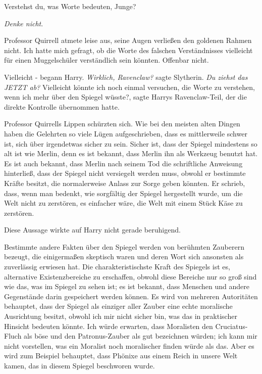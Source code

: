 \glqq{}Verstehst du, was Worte bedeuten, Junge?\grqq{}

\glqq{}\emph{Denke nicht}.\grqq{}

Professor Quirrell atmete leise aus, seine Augen verließen den goldenen Rahmen
nicht. \glqq{}Ich hatte mich gefragt, ob die Worte des falschen Verständnisses
vielleicht für einen Muggelschüler verständlich sein könnten. Offenbar
nicht.\grqq{}

\glqq{}Vielleicht -\grqq{} begann Harry. \emph{Wirklich, Ravenclaw?} sagte
Slytherin. \emph{Du ziehst das JETZT ab?} \glqq{}Vielleicht könnte ich noch
einmal versuchen, die Worte zu verstehen, wenn ich mehr über den Spiegel
wüsste?\grqq{}, sagte Harrys Ravenclaw-Teil, der die direkte Kontrolle
übernommen hatte.

Professor Quirrells Lippen schürzten sich. \glqq{}Wie bei den meisten alten
Dingen haben die Gelehrten so viele Lügen aufgeschrieben, dass es mittlerweile
schwer ist, sich über irgendetwas sicher zu sein. Sicher ist, dass der Spiegel
mindestens so alt ist wie Merlin, denn es ist bekannt, dass Merlin ihn als
Werkzeug benutzt hat. Es ist auch bekannt, dass Merlin nach seinem Tod die
schriftliche Anweisung hinterließ, dass der Spiegel nicht versiegelt werden
muss, obwohl er bestimmte Kräfte besitzt, die normalerweise Anlass zur Sorge
geben könnten. Er schrieb, dass, wenn man bedenkt, wie sorgfältig der Spiegel
hergestellt wurde, um die Welt nicht zu zerstören, es einfacher wäre, die Welt
mit einem Stück Käse zu zerstören.\grqq{}

Diese Aussage wirkte auf Harry nicht gerade beruhigend.

\glqq{}Bestimmte andere Fakten über den Spiegel werden von berühmten Zauberern
bezeugt, die einigermaßen skeptisch waren und deren Wort sich ansonsten als
zuverlässig erwiesen hat. Die charakteristischste Kraft des Spiegels ist es,
alternative Existenzbereiche zu erschaffen, obwohl diese Bereiche nur so groß
sind wie das, was im Spiegel zu sehen ist; es ist bekannt, dass Menschen und
andere Gegenstände darin gespeichert werden können. Es wird von mehreren
Autoritäten behauptet, dass der Spiegel als einziger aller Zauber eine echte
moralische Ausrichtung besitzt, obwohl ich mir nicht sicher bin, was das in
praktischer Hinsicht bedeuten könnte. Ich würde erwarten, dass Moralisten den
Cruciatus-Fluch als \glqq{}böse\grqq{} und den Patronus-Zauber als \glqq{}
gut\grqq{} bezeichnen würden; ich kann mir nicht vorstellen, was ein Moralist
noch moralischer finden würde als das. Aber es wird zum Beispiel behauptet, dass
Phönixe aus einem Reich in unsere Welt kamen, das in diesem Spiegel beschworen
wurde.\grqq{}

